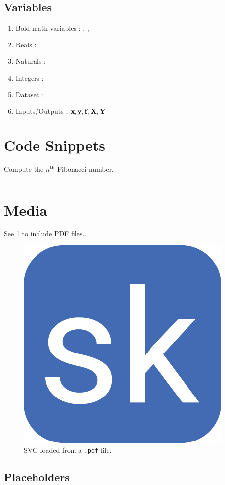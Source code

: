 \documentclass{article}
\begin{document}
\subsection{Variables}
\begin{enumerate}%
\item Bold math variables \vrb{\mbf{}}: \mbf{\Sigma}, ,
\item Reals \vrb{\reals}: \reals
\item Naturals \vrb{\naturals}: \naturals
\item Integers \vrb{\ints}: \ints
\item Dataset \vrb{\dset}: \dset
\item Inputs/Outputs \vrb{\xvec,\yvec,\fvec,\Xvec,\Yvec}: ${\boldsymbol{\mathbf{x}}},{\boldsymbol{\mathbf{y}}},{\boldsymbol{\mathbf{f}}},{\boldsymbol{\mathbf{X}}},{\boldsymbol{\mathbf{Y}}}$
\end{enumerate}

\section{Code Snippets}

\begin{code}
\caption{Compute the $n^{\mathrm{th}}$ Fibonacci number.} \label{code:sample}
\inputminted[firstline=1,lastline=10,fontsize=\small]{python}{test.py}
\end{code}

\section{Media}

See \cref{fig:svg_pdf} to include PDF files..

\begin{figure}[ht]
    \centering
	\includegraphics[width=0.15\linewidth]{favicon.pdf} 
    \caption{SVG loaded from a \texttt{.pdf} file.}
    \label{fig:svg_pdf}
\end{figure}    

\subsection{Placeholders}
\end{document}
